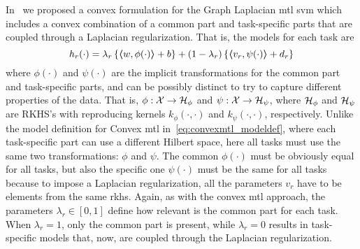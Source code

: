 In~\cite{RuizAD21_hais} we proposed a convex formulation for the Graph Laplacian \acrshort{mtl} \acrshort{svm} which includes a convex combination of a common part and task-specific parts that are coupled through a Laplacian regularization.
That is, the models for each task are
\begin{equation}
    \nonumber
    h_r({\cdot}) = \lambda_r \left\lbrace \bm{\left\langle} w, \phi(\cdot) \bm{\right\rangle} + b  \right\rbrace + (1 - \lambda_r) \left\lbrace \bm{\left\langle} {v}_r, \psi(\cdot) \bm{\right\rangle} + d_r \right\rbrace
\end{equation}
where $\phi(\cdot)$ and $\psi(\cdot)$ are the implicit transformations for the common part and task-specific parts, and can be possibly distinct to try to capture different properties of the data.
That is, $\phi: \mathcal{X} \to \mathcal{H}_\phi$ and $\psi: \mathcal{X} \to \mathcal{H}_\psi$, where $\mathcal{H}_\phi$ and $\mathcal{H}_\psi$ are RKHS's with reproducing kernels $k_\phi(\cdot, \cdot)$ and $k_\psi(\cdot, \cdot)$, respectively.
Unlike the model definition for Convex \acrshort{mtl} in~\eqref{eq:convexmtl_modeldef}, where each task-specific part can use a different Hilbert space, here all tasks must use the same two transformations: $\phi$ and $\psi$. The common $\phi(\cdot)$ must be obviously equal for all tasks, but also the specific one $\psi(\cdot)$ must be the same for all tasks because to impose a Laplacian regularization, all the parameters $v_r$ have to be elements from the same \acrshort{rkhs}.
Again, as with the convex \acrshort{mtl} approach, the parameters $\lambda_r \in [0, 1]$ define how relevant is the common part for each task. When $\lambda_r=1$, only the common part is present, while $\lambda_r=0$ results in task-specific models that, now, are coupled through the Laplacian regularization.

